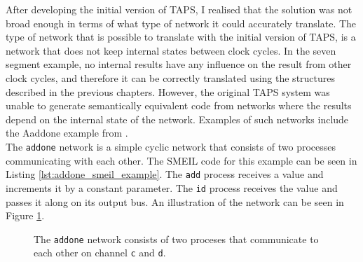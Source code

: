 After developing the initial version of TAPS, I realised that the solution was not broad enough in terms of what type of network it could accurately translate. The type of network that is possible to translate with the initial version of TAPS, is a network that does not keep internal states between clock cycles.
In the seven segment example, no internal results have any influence on the result from other clock cycles, and therefore it can be correctly translated using the structures described in the previous chapters.
However, the original TAPS system was unable to generate semantically equivalent \cspm{} code from networks where the results depend on the internal state of the network. Examples of such networks include the Aaddone example from \cite{smeil}.\\

The \texttt{addone} network is a simple cyclic network that consists of two processes communicating with each other. The SMEIL code for this example can be seen in Listing \ref{lst:addone_smeil_example}. The \texttt{add} process receives a value and increments it by a constant parameter. The \texttt{id} process receives the value and passes it along on its output bus.
An illustration of the network can be seen in Figure \ref{fig:addone_unclocked}.\\
\begin{figure}
    \centering
    \caption{The \texttt{addone} network consists of two proceses that communicate to each other on channel \texttt{c} and \texttt{d}.}
    \label{fig:addone_unclocked}
\end{figure}

